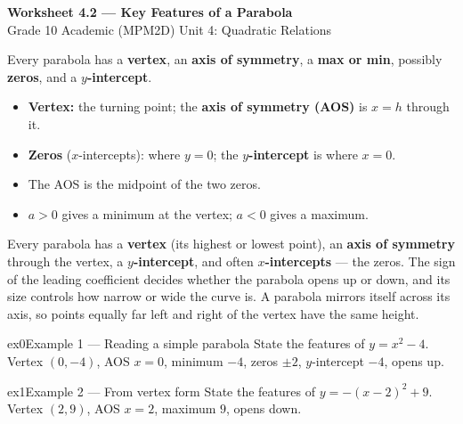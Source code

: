 \documentclass[11pt]{article}
\begin{document}
\begin{center}
{\LARGE\bfseries\color{titleblue}Worksheet 4.2 --- Key Features of a Parabola}\\[2pt]
{\small Grade 10 Academic (MPM2D) \textperiodcentered{} Unit 4: Quadratic Relations}
\end{center}

\begin{ideabox}
Every parabola has a \textbf{vertex}, an \textbf{axis of symmetry}, a \textbf{max or min}, possibly \textbf{zeros}, and a \textbf{$y$-intercept}.
\begin{itemize}[leftmargin=*,itemsep=2pt]
  \item \textbf{Vertex:} the turning point; the \textbf{axis of symmetry (AOS)} is $x=h$ through it.
  \item \textbf{Zeros} ($x$-intercepts): where $y=0$; the \textbf{$y$-intercept} is where $x=0$.
  \item The AOS is the midpoint of the two zeros.
  \item $a>0$ gives a minimum at the vertex; $a<0$ gives a maximum.
\end{itemize}
\end{ideabox}

\begin{learnbox}
Every parabola has a \textbf{vertex} (its highest or lowest point), an \textbf{axis of symmetry} through the vertex, a \textbf{$y$-intercept}, and often \textbf{$x$-intercepts} — the zeros.
The sign of the leading coefficient decides whether the parabola opens up or down, and its size controls how narrow or wide the curve is.
A parabola mirrors itself across its axis, so points equally far left and right of the vertex have the same height.
\end{learnbox}


\begin{example}{ex0}{Example 1 --- Reading a simple parabola}
State the features of $y=x^2-4$.
\soln Vertex $(0,-4)$, AOS $x=0$, minimum $-4$, zeros $\pm2$, $y$-intercept $-4$, opens up.
\end{example}

\begin{example}{ex1}{Example 2 --- From vertex form}
State the features of $y=-(x-2)^2+9$.
\soln Vertex $(2,9)$, AOS $x=2$, maximum $9$, opens down.
\end{example}
\end{document}
